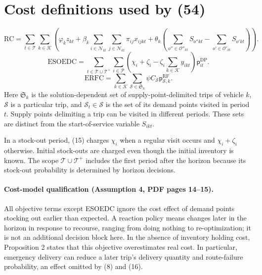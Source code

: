 \documentclass[10pt]{article}
\begin{document}
\section*{Cost definitions used by (54)}
\begin{equation}
\mathrm{RC}=\sum_{t\in\mathcal T}\sum_{k\in\mathcal K}
\left(\varphi_kz_{kt}+\beta_k\sum_{i\in\mathcal N_{kt}}\sum_{j\in\mathcal N_{kt}}\pi_{ij}x_{ijkt}
+\theta_k\left(\sum_{o''\in\mathcal O''_{kt}}S_{o''kt}-\sum_{o'\in\mathcal O'_{kt}}S_{o'kt}\right)\right).
\tag{13}
\end{equation}
\begin{equation}
\mathrm{ESOEDC}=\sum_{t\in\mathcal T\cup\mathcal T^+}\sum_{i\in\mathcal P}
\left(\chi_i+\zeta_i-\zeta_i\sum_{k\in\mathcal K}y_{ikt}\right)\mathsf p^{\mathrm{DP}}_{it}.
\tag{15}
\end{equation}
\begin{equation}
\mathrm{ERFC}=\sum_{k\in\mathcal K}\sum_{\mathcal S\in\mathfrak S_k}
\psi C_{\mathcal S}\mathsf p^{\mathrm{RF}}_{\mathcal S,k}.
\tag{16}
\end{equation}
Here $\mathfrak S_k$ is the solution-dependent set of supply-point-delimited trips of vehicle $k$, $\mathcal S$ is a particular trip, and $\mathcal S_t\in\mathcal S$ is the set of its demand points visited in period $t$. Supply points delimiting a trip can be visited in different periods. These sets are distinct from the start-of-service variable $S_{ikt}$.

In a stock-out period, (15) charges $\chi_i$ when a regular visit occurs and $\chi_i+\zeta_i$ otherwise. Initial stock-outs are charged even though the initial inventory is known. The scope $\mathcal T\cup\mathcal T^+$ includes the first period after the horizon because its stock-out probability is determined by horizon decisions.

\paragraph{Cost-model qualification (Assumption 4, PDF pages 14--15).}
All objective terms except ESOEDC ignore the cost effect of demand points stocking out earlier than expected. A reaction policy means changes later in the horizon in response to recourse, ranging from doing nothing to re-optimization; it is not an additional decision block here. In the absence of inventory holding cost, Proposition 2 states that this objective overestimates real cost. In particular, emergency delivery can reduce a later trip's delivery quantity and route-failure probability, an effect omitted by (8) and (16).
\end{document}
